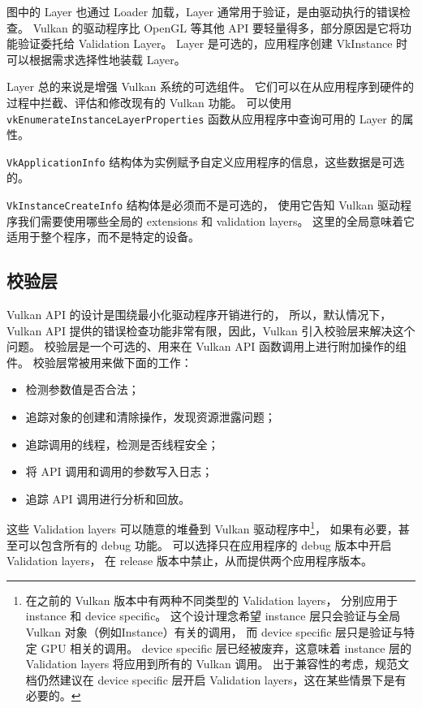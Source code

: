 \documentclass[a4paper, 12pt]{ctexart}
\begin{document}
    图中的 Layer 也通过 Loader 加载，Layer 通常用于验证，是由驱动执行的错误检查。
    Vulkan 的驱动程序比 OpenGL 等其他 API 要轻量得多，部分原因是它将功能验证委托给 Validation Layer。
    Layer 是可选的，应用程序创建 VkInstance 时可以根据需求选择性地装载 Layer。

    Layer 总的来说是增强 Vulkan 系统的可选组件。
    它们可以在从应用程序到硬件的过程中拦截、评估和修改现有的 Vulkan 功能。
    可以使用 \texttt{vkEnumerateInstanceLayerProperties} 函数从应用程序中查询可用的 Layer 的属性。
    
    \texttt{VkApplicationInfo} 结构体为实例赋予自定义应用程序的信息，这些数据是可选的。

    \texttt{VkInstanceCreateInfo} 结构体是必须而不是可选的，
    使用它告知 Vulkan 驱动程序我们需要使用哪些全局的 extensions 和 validation layers。
    这里的全局意味着它适用于整个程序，而不是特定的设备。


\clearpage
\subsection{校验层}
    Vulkan API 的设计是围绕最小化驱动程序开销进行的，
    所以，默认情况下，Vulkan API 提供的错误检查功能非常有限，因此，Vulkan 引入校验层来解决这个问题。
    校验层是一个可选的、用来在 Vulkan API 函数调用上进行附加操作的组件。
    校验层常被用来做下面的工作：

    \begin{itemize}[itemindent=1em, itemsep=0pt, topsep=0pt, parsep=0pt]
        \item 检测参数值是否合法；
        \item 追踪对象的创建和清除操作，发现资源泄露问题；
        \item 追踪调用的线程，检测是否线程安全；
        \item 将 API 调用和调用的参数写入日志；
        \item 追踪 API 调用进行分析和回放。
    \end{itemize}

    这些 Validation layers 可以随意的堆叠到 Vulkan 驱动程序中\footnote{
        在之前的 Vulkan 版本中有两种不同类型的 Validation layers，
        分别应用于 instance 和 device specific。
        这个设计理念希望 instance 层只会验证与全局 Vulkan 对象（例如Instance）有关的调用，
        而 device specific 层只是验证与特定 GPU 相关的调用。
        device specific 层已经被废弃，这意味着 instance 层的 Validation layers 将应用到所有的 Vulkan 调用。
        出于兼容性的考虑，规范文档仍然建议在 device specific 层开启 Validation layers，这在某些情景下是有必要的。
    }，
    如果有必要，甚至可以包含所有的 debug 功能。
    可以选择只在应用程序的 debug 版本中开启 Validation layers，
    在 release 版本中禁止，从而提供两个应用程序版本。
\end{document}
